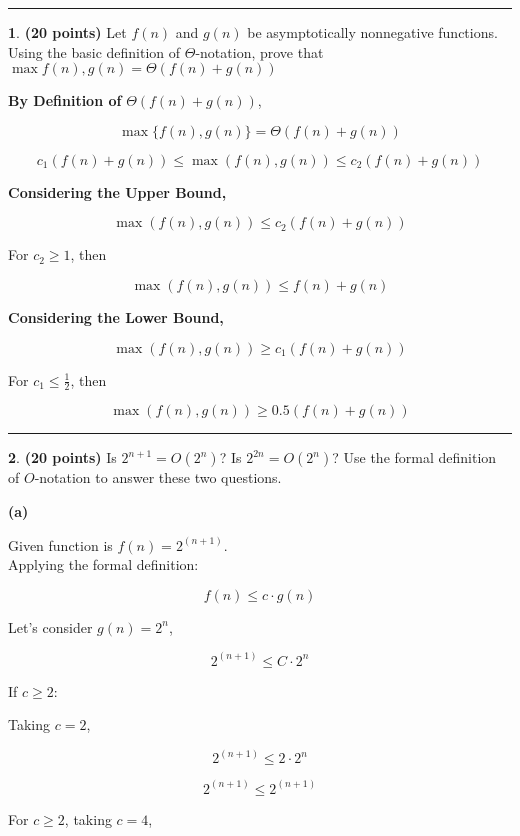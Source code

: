 \documentclass[11pt]{article}
\newcommand{\finishproblem}{
    \vspace{10pt}
    \hrule
    \vspace{10pt}
}
\theoremstyle{definition}
\newtheorem{prob}{}
\newcommand{\solution}{\medskip\noindent{\color{DarkBlue}\textbf{Solution:}}}
\begin{document}
\finishproblem
\begin{prob} \textbf{(20 points)} Let $f(n)$ and $g(n)$ be asymptotically nonnegative functions. Using the basic definition of $\Theta$-notation, prove that $\max{f(n), g(n)} = \Theta(f(n)+g(n))$
\end{prob}
\solution

\textbf{By Definition of} \( \Theta(f(n) + g(n)) \),

\[
\max \{ f(n), g(n) \} = \Theta(f(n) + g(n))
\]

\[
c_1(f(n) + g(n)) \leq \max(f(n), g(n)) \leq c_2(f(n) + g(n))
\]

\textbf{Considering the Upper Bound,}

\[
\max(f(n), g(n)) \leq c_2(f(n) + g(n))
\]

For \( c_2 \geq 1 \), then

\[
\max(f(n), g(n)) \leq f(n) + g(n)
\]

\textbf{Considering the Lower Bound,}

\[
\max(f(n), g(n)) \geq c_1(f(n) + g(n))
\]

For \( c_1 \leq \frac{1}{2} \), then

\[
\max(f(n), g(n)) \geq 0.5(f(n) + g(n))
\]

\finishproblem

\begin{prob} \textbf{(20 points)} Is $2^{n+1}=O(2^n)$? Is $2^{2n}=O(2^n)$? Use the formal definition of $O$-notation to answer these two questions.
\end{prob}
\solution

\textbf{(a)} 

Given function is \( f(n) = 2^{(n+1)} \). \\
Applying the formal definition:

\[
f(n) \leq c \cdot g(n)
\]

Let's consider \( g(n) = 2^n \),

\[
2^{(n+1)} \leq C \cdot 2^n
\]

If \( c \geq 2 \):

Taking \( c = 2 \),

\[
2^{(n+1)} \leq 2 \cdot 2^n
\]

\[
2^{(n+1)} \leq 2^{(n+1)}
\]

For \( c \geq 2 \), taking \( c = 4 \),
\end{document}
